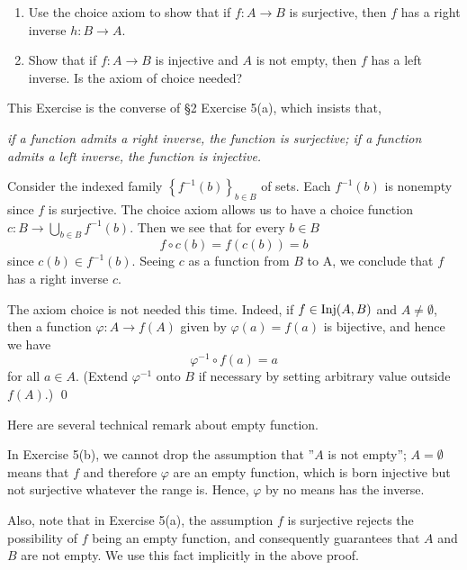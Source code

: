 \documentclass[a4paper,12pt]{article}
\begin{document}
\begin{exe}\leavevmode \par
	\begin{enumerate}
		\item
		      Use the choice axiom to show that if \( f:A \to B \) is surjective,
		      then \( f \) has a right inverse \( h:B\to A \).
		      
		\item
		      Show that if \( f:A \to B \) is injective and \( A \) is not empty,
		      then \( f \) has a left inverse.
		      Is the axiom of choice needed?
	\end{enumerate}
\end{exe}
\begin{sol}
	This Exercise is the converse of \S2 Exercise 5(a),
	which insists that,
	
	\noindent \textit{if a function admits a right inverse, the function is surjective;
		if a function admits a left inverse, the function is injective.}
	
	Consider the indexed family \( \left\{ f ^{-1}(b) \right\}_{b\in B} \) of sets.
	Each \( f ^{-1}(b) \) is nonempty since \( f \) is surjective.
	The choice axiom allows us to have a choice function
	\( c:B \to \bigcup_{b \in B}f ^{-1}(b) \).
	Then we see that for every \( b\in B \)
	\begin{equation*}
		f \circ c(b) = f(c(b)) = b
	\end{equation*}
	since \( c(b) \in f ^{-1}(b) \).
	Seeing \( c \) as a function from \( B \) to A,
	we conclude that  \( f \) has a right inverse \( c \).
	
	The axiom choice is not needed this time.
	Indeed,
	if \( f \in \mathrm{Inj}(A,B) \)
	and \( A \neq \emptyset \),
	then a function \( \varphi:A \to f(A) \)
	given by
	\( \varphi(a)=f(a) \)
	is bijective,
	and hence we have
	\begin{equation*}
		\varphi ^{-1} \circ f(a) = a
	\end{equation*}
	for all \( a \in A \).
	(Extend \( \varphi ^{-1} \) onto \( B \) if necessary by setting arbitrary value outside \( f(A) \).)
	\qed\end{sol}

\begin{rem}
	Here are several technical remark about empty function.
	
	In Exercise 5(b), we cannot drop the assumption that ''\( A \) is not empty'';
	\( A = \emptyset \) means that
	\( f \) and therefore \( \varphi \) are an empty function,
	which is born injective but not surjective whatever the range is.
	Hence, \( \varphi \) by no means has the inverse.
	
	Also, note that in Exercise 5(a), the assumption \( f \) is surjective
	rejects the possibility of 
	\( f \) being an empty function,
	and consequently guarantees that \( A \) and \( B \) are not empty.
	We use this fact implicitly in the above proof.  
\end{rem}
\end{document}
